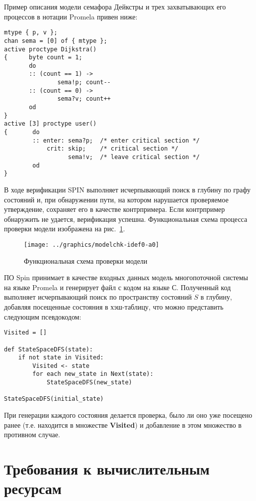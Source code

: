 \documentclass[12pt,a4paper,fleqn]{article}
\newcommand{\Code}[1]{\textbf{\mbox{#1}}}
\begin{document}
Пример описания модели семафора Дейкстры и трех захватывающих его процессов в нотации
Promela привен ниже:

\begin{lstlisting}[language=Promela]
mtype { p, v };
chan sema = [0] of { mtype };
active proctype Dijkstra()
{      byte count = 1;
       do
       :: (count == 1) ->
               sema!p; count--
       :: (count == 0) ->
               sema?v; count++
       od
}
active [3] proctype user()
{       do
        :: enter: sema?p;  /* enter critical section */
            crit: skip;    /* critical section */
                  sema!v;  /* leave critical section */
        od
}  
\end{lstlisting}

В ходе верификации SPIN выполняет исчерпывающий поиск в глубину по графу состояний и, при
обнаружении пути, на котором нарушается проверяемое утверждение, сохраняет его в качестве
контрпримера. Если контрпример обнаружить не удается, верификация успешна. Функциональная
схема процесса проверки модели изображена на рис.~\ref{fig:modelchk-idef0-a0}.

\begin{figure}[ht]
  \centering
  \texttt{[image: ../graphics/modelchk-idef0-a0]}
  \caption{Функциональная схема проверки модели}
  \label{fig:modelchk-idef0-a0}
\end{figure}

ПО Spin принимает в качестве входных данных модель многопоточной системы на языке Promela и
генерирует файл с кодом на языке С. Полученный код выполняет исчерпывающий поиск по пространству
состояний $S$ в глубину, добавляя посещенные состояния в хэш-таблицу, что можно представить
следующим псевдокодом:

\begin{lstlisting}[style=pseudocode]
Visited = []

def StateSpaceDFS(state):
    if not state in Visited:
        Visited <- state
        for each new_state in Next(state):
            StateSpaceDFS(new_state)

StateSpaceDFS(initial_state)
\end{lstlisting}

При генерации каждого состояния делается проверка, было ли оно уже посещено ранее (т.е. находится в
множестве \Code{Visited}) и добавление в этом множество в противном случае.

\section{Требования к вычислительным ресурсам}
\end{document}
